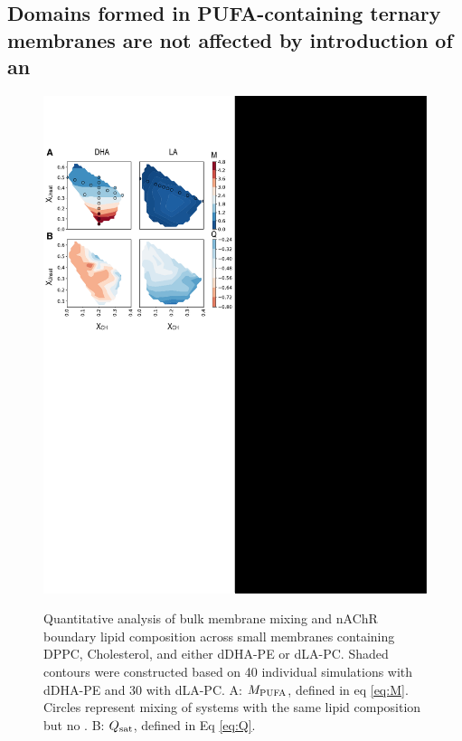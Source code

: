 \subsection {Domains formed in PUFA-containing ternary membranes are not affected by introduction of an \nachr } \label{Demix}
	\begin{figure}[h!]
		{
		\includegraphics[width=1\linewidth]{ModelMemb_Images/Fig2.pdf}}
		\caption[Quantitative analysis of bulk membrane mixing and nAChR boundary lipid composition across small membranes containing DPPC, Cholesterol, and either dDHA-PE or dLA-PC.] {Quantitative analysis of bulk membrane mixing and nAChR boundary lipid composition across small membranes containing DPPC, Cholesterol, and either dDHA-PE or dLA-PC. Shaded contours were constructed based on 40 individual simulations with dDHA-PE and 30 with dLA-PC. A: $M_{\mathrm{PUFA}}$, defined in eq \ref{eq:M}.  Circles represent mixing of systems with the same lipid composition but no \nachr. B: $Q_{\mathrm{sat}}$, defined in Eq \ref{eq:Q}.}   
		\label{fig:fig2}
	\end{figure} 
	
